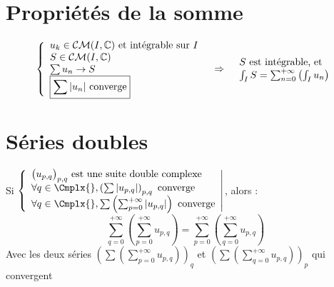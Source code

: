 \documentclass[11pt,a4paper,fleqn,pdftex]{report}
\begin{document}
\section{Propriétés de la somme}
\begin{itheorem}
\begin{equation}
\begin{array}{r c l}
\left\lbrace
\begin{array}{l}
u_k \in \mathcal{CM}(I,\mathbb{C})\text{ et intégrable sur }I\\
S \in \mathcal{CM}(I,\mathbb{C})\\
\sum u_n \to S\\
\boxed{\sum |u_n| \text{ converge}} 
\end{array}
\right.&\Rightarrow &
\begin{array}{l}
S\text{ est intégrable, et}\\
\int_I S = \sum_{n=0}^{+\infty} \left( \int_I u_n \right)
\end{array}
\end{array}
\end{equation}
\end{itheorem}
\section{Séries doubles} %
\label{sec:series_doubles}
\begin{itheorem}\label{th:fubini}
    Si 
    $\left\lbrace \begin{array}{l}
        \big( u_{p,q} \big)_{p,q} \text{ est une suite double complexe} \\
        \forall q \in \Cmplx{}, \left( \sum \left| u_{p,q}\right| \right)_{p,q} \text{ converge} \\
        \forall q \in \Cmplx{}, \sum \left( \sum_{p=0}^{+\infty} \left| u_{p,q}\right| \right) \text{ converge}
    \end{array}\right| $, alors : 
    \begin{equation}
        \sum_{q=0}^{+\infty} \left( \sum_{p=0}^{+\infty} u_{p,q} \right) = \sum_{p=0}^{+\infty} \left( \sum_{q=0}^{+\infty}  u_{p,q} \right) 
    \end{equation}
    Avec les deux séries $\left( \sum \left( \sum_{p=0}^{+\infty} u_{p,q} \right)\right)_q$ et $\left( \sum \left( \sum_{q=0}^{+\infty}  u_{p,q} \right) \right)_p$  qui convergent
\end{itheorem}
\end{document}
